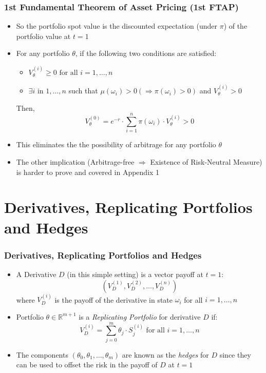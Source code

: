 \documentclass{beamer}
\begin{document}
\begin{frame}
\frametitle{1st Fundamental Theorem of Asset Pricing (1st FTAP)}
\begin{itemize}
\item So the portfolio spot value is the discounted expectation (under $\pi$) of the portfolio value at $t=1$
\item For any portfolio $\theta$, if the following two conditions are satisfied:
\begin{itemize}
\item $V_{\theta}^{(i)} \geq 0 \mbox{ for all } i = 1, \ldots,n$
\item $\exists i$ in $1, \ldots, n$ such that $\mu(\omega_i) > 0 (\Rightarrow \pi(\omega_i) > 0)$ and $V_{\theta}^{(i)} > 0$
\end{itemize}
Then, $$V_{\theta}^{(0)} = e^{-r} \cdot \sum_{i=1}^n \pi(\omega_i) \cdot V_{\theta}^{(i)} > 0$$
\item This eliminates the the possibility of arbitrage for any portfolio $\theta$
\item The other implication (Arbitrage-free $\Rightarrow$ Existence of Risk-Neutral Measure) is harder to prove and covered in Appendix 1
\end{itemize}
\end{frame}

\section{Derivatives, Replicating Portfolios and Hedges}

\begin{frame}
\frametitle{Derivatives, Replicating Portfolios and Hedges}
\begin{itemize}
\item A Derivative $D$ (in this simple setting) is a vector payoff at $t=1$:
$$(V_D^{(1)}, V_D^{(2)}, \ldots, V_D^{(n)})$$
where $V_D^{(i)}$ is the payoff of the derivative in state $\omega_i$ for all $i = 1, \ldots, n$
\item Portfolio $\theta \in \mathbb{R}^{m+1}$ is a {\em Replicating Portfolio} for derivative $D$ if:
\begin{equation}
V_D^{(i)} = \sum_{j=0}^m \theta_j \cdot S_j^{(i)} \mbox{ for all } i = 1, \ldots, n \label{eq:endreplport}
\end{equation}
\item The components $(\theta_0, \theta_1, \ldots, \theta_m)$ are known as the {\em hedges} for $D$ since they can be used to offset 
the risk in the payoff of $D$ at $t=1$
\end{itemize}
\end{frame}
\end{document}
